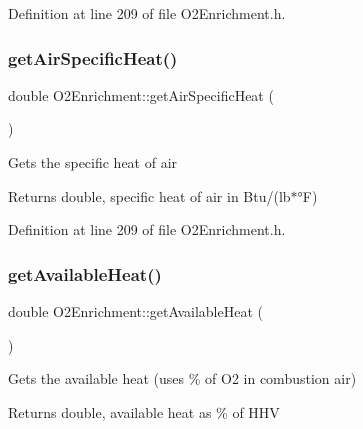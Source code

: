 Definition at line 209 of file O2\+Enrichment.\+h.

\mbox{\label{class_o2_enrichment_a435552fca78d0648dddaf406e250e9b6}} 
\subsubsection{\texorpdfstring{get\+Air\+Specific\+Heat()}{getAirSpecificHeat()}\hspace{0.1cm}{\footnotesize\ttfamily [3/3]}}
{\footnotesize\ttfamily double O2\+Enrichment\+::get\+Air\+Specific\+Heat (\begin{DoxyParamCaption}{ }\end{DoxyParamCaption})\hspace{0.3cm}{\ttfamily [inline]}}

Gets the specific heat of air \begin{DoxyReturn}{Returns}
double, specific heat of air in Btu/(lb$\ast$°F) 
\end{DoxyReturn}


Definition at line 209 of file O2\+Enrichment.\+h.

\mbox{\label{class_o2_enrichment_ac34e93c7e1444ab81a621428f0eee4d3}} 
\subsubsection{\texorpdfstring{get\+Available\+Heat()}{getAvailableHeat()}\hspace{0.1cm}{\footnotesize\ttfamily [1/3]}}
{\footnotesize\ttfamily double O2\+Enrichment\+::get\+Available\+Heat (\begin{DoxyParamCaption}{ }\end{DoxyParamCaption})\hspace{0.3cm}{\ttfamily [inline]}}

Gets the available heat (uses \% of O2 in combustion air) \begin{DoxyReturn}{Returns}
double, available heat as \% of H\+HV 
\end{DoxyReturn}


